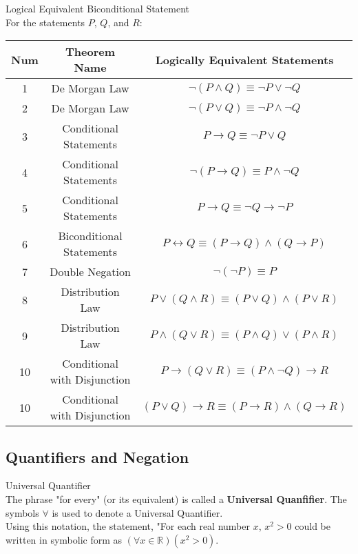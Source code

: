 \begin{tcolorbox}
\begin{theorem}
Logical Equivalent Biconditional Statement \\
For the statements $P$, $Q$, and $R$: \\
\begin{tabular}{|c|c|c|}
\hline 
Num & Theorem Name & Logically Equivalent Statements \\ 
\hline 
1 & De Morgan Law & $\neg(P \wedge Q) \equiv \neg P \vee \neg Q$ \\ 
\hline 
2 & De Morgan Law & $\neg(P \vee Q) \equiv \neg P \wedge \neg Q$ \\ 
\hline 
3 & Conditional Statements  & $P \to Q \equiv \neg P \vee Q$ \\ 
\hline 
4 & Conditional Statements & $\neg (P \to Q) \equiv P \wedge \neg Q$ \\ 
\hline 
5 & Conditional Statements & $P \to Q \equiv \neg Q \to \neg P$ \\ 
\hline 
6 & Biconditional Statements & $P \leftrightarrow Q \equiv (P \to Q) \wedge (Q \to P)$ \\ 
\hline 
7 & Double Negation & $\neg(\neg P) \equiv P$ \\ 
\hline 
8 & Distribution Law & $P \vee (Q \wedge R) \equiv (P \vee Q) \wedge (P \vee R)$ \\ 
\hline 
9 & Distribution Law & $P \wedge (Q \vee R) \equiv (P \wedge Q) \vee (P \wedge R)$ \\ 
\hline 
10 & Conditional with Disjunction & $P \to (Q \vee R) \equiv (P \wedge \neg Q) \to R$ \\ 
\hline 
10 & Conditional with Disjunction & $(P \vee Q) \to R \equiv (P \to R) \wedge (Q \to R)$ \\ 
\hline 
\end{tabular} 
\end{theorem}
\end{tcolorbox}





\newpage
\subsection{Quantifiers and Negation}

\begin{definition}
Universal Quantifier \\

The phrase "for every" (or its equivalent) is called a {\bf Universal Quanfifier}. The symbols $\forall$ is used to denote a Universal Quantifier. \\
Using this notation, the statement, "For each real number $x$, $x^2 > 0$ could be written in symbolic form as $(\forall x \in \mathbb{R})(x^2 > 0)$.  

\end{definition} 



